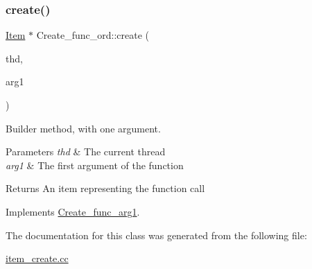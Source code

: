 \subsubsection{\texorpdfstring{create()}{create()}}
{\footnotesize\ttfamily \mbox{\hyperlink{classItem}{Item}} $\ast$ Create\+\_\+func\+\_\+ord\+::create (\begin{DoxyParamCaption}\item[{T\+HD $\ast$}]{thd,  }\item[{\mbox{\hyperlink{classItem}{Item}} $\ast$}]{arg1 }\end{DoxyParamCaption})\hspace{0.3cm}{\ttfamily [virtual]}}

Builder method, with one argument. 
\begin{DoxyParams}{Parameters}
{\em thd} & The current thread \\
\hline
{\em arg1} & The first argument of the function \\
\hline
\end{DoxyParams}
\begin{DoxyReturn}{Returns}
An item representing the function call 
\end{DoxyReturn}


Implements \mbox{\hyperlink{classCreate__func__arg1_a3e9a98f755cd82c3e762e334c955a8c9}{Create\+\_\+func\+\_\+arg1}}.



The documentation for this class was generated from the following file\+:\begin{DoxyCompactItemize}
\item 
\mbox{\hyperlink{item__create_8cc}{item\+\_\+create.\+cc}}\end{DoxyCompactItemize}
